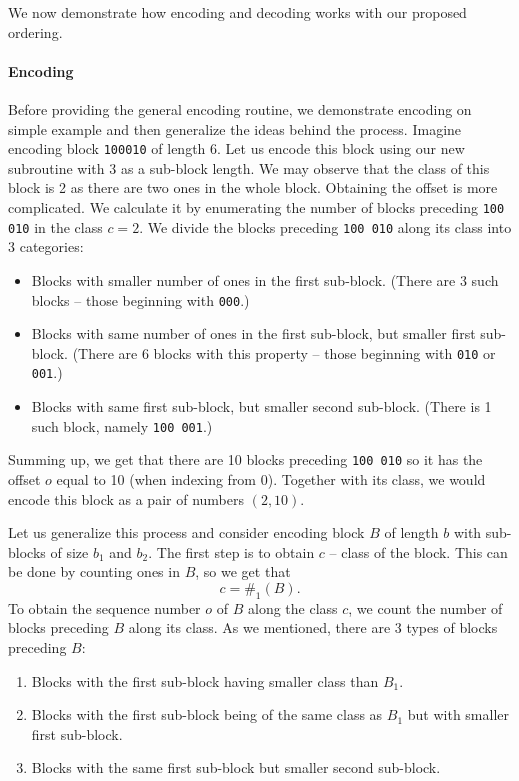 We now demonstrate how encoding and decoding works with our proposed ordering.

\paragraph{Encoding}

Before providing the general encoding routine, we demonstrate encoding on
simple example and then generalize the ideas behind the process. Imagine encoding
block {\tt 100010} of length 6. Let us encode this block using our new
subroutine with 3 as a sub-block length. We may observe that the class of this
block is 2 as there are two ones in the whole block. Obtaining the offset is
more complicated. We calculate it by enumerating the number of blocks preceding
{\tt 100 010} in the class $c=2$. We divide the blocks preceding {\tt 100 010}
along its class into 3 categories:

\begin{itemize}
    \item Blocks with smaller number of ones in the first sub-block.
    (There are 3 such blocks -- those beginning with {\tt 000}.)
    \item Blocks with same number of ones in the first sub-block, but smaller first sub-block.
    (There are 6 blocks with this property -- those beginning with {\tt 010} or {\tt 001}.)
    \item Blocks with same first sub-block, but smaller second sub-block.
    (There is 1 such block, namely {\tt 100 001}.)
\end{itemize}

Summing up, we get that there are 10 blocks preceding {\tt 100 010} so it
has the offset $o$ equal to 10 (when indexing from 0). Together with its
class, we would encode this block as a pair of numbers $(2, 10)$.

Let us generalize this process and consider encoding block $B$ of length $b$
with sub-blocks of size $b_1$ and $b_2$. The first step is to obtain $c$ --
class of the block. This can be done by counting ones in $B$, so we get that
$$c=\#_1(B).$$ To obtain the sequence number $o$ of $B$ along the class $c$,
we count the number of blocks preceding $B$ along its class. As we mentioned,
there are 3 types of blocks preceding $B$:

\begin{enumerate}
    \item Blocks with the first sub-block having smaller class than $B_1$.
    \label{chapter3:encoding:1}
    \item Blocks with the first sub-block being of the same class as $B_1$
    but with smaller first sub-block. \label{chapter3:encoding:2}
    \item Blocks with the same first sub-block but smaller second sub-block.
    \label{chapter3:encoding:3}
\end{enumerate}


